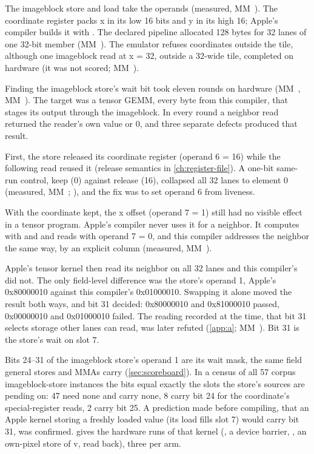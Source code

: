 The imageblock store  and load  take the operands
 (measured,
MM~). The coordinate register packs x in its low 16 bits and y in its high 16; Apple's compiler builds it with
. The declared pipeline allocated 128 bytes for 32 lanes of one 32-bit member
(MM~). The emulator refuses coordinates outside the tile, although one imageblock read at
x = 32, outside a 32-wide tile, completed on hardware (it was not scored; MM~).

Finding the imageblock store's wait bit took eleven rounds on hardware (MM~, MM~). The target was a
tensor GEMM, every byte from this compiler, that stages its output through the imageblock. In every round a neighbor
read returned the reader's own value or 0, and three separate defects produced that result.

First, the store released its coordinate register (operand 6 = 16) while the following read
reused it (release semantics in \cref{ch:register-file}). A one-bit same-run control, keep (0) against release (16), collapsed
all 32 lanes to element 0 (measured, MM~; ), and the fix was to set
operand 6 from liveness.

With the coordinate kept, the x offset (operand 7 = 1) still had no visible effect in a tensor
program. Apple's compiler never uses it for a neighbor. It computes  with  and
 and reads with operand 7 = 0, and this compiler addresses the neighbor the same way, by an explicit column
(measured, MM~).

Apple's tensor kernel then read its neighbor on all 32 lanes and this compiler's did not. The only
field-level difference was the store's operand 1, Apple's 0x80000010 against this compiler's 0x01000010. Swapping it
alone moved the result both ways, and bit 31 decided: 0x80000010 and 0x81000010 passed, 0x00000010 and 0x01000010
failed. The reading recorded at the time, that bit 31 selects storage other lanes can read, was later refuted
(\cref{app:a}; MM~). Bit 31 is the store's wait on slot 7.

Bits 24--31 of the imageblock store's operand 1 are its wait mask, the same field general stores and MMAs carry
(\cref{sec:scoreboard}). In a census of all 57 corpus
imageblock-store instances the bits equal exactly the slots the store's sources are pending on: 47 need none and carry none, 8 carry bit
24 for the coordinate's special-register reads, 2 carry bit 25. A prediction made before compiling, that an Apple kernel
storing a freshly loaded value (its load fills slot 7) would carry bit 31, was confirmed.  gives
the hardware runs of that kernel (, a device barrier, , an own-pixel store of v, read back), three per arm.

